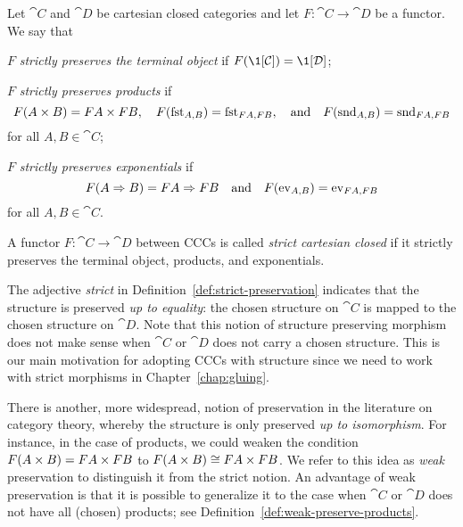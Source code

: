 \begin{defn} \label{def:strict-preservation}
Let $\cat{C}$ and $\cat{D}$ be cartesian closed categories and let $F : \cat{C} \to \cat{D}$ be a functor. We say that
\begin{enum}
    \item $F$ \emph{strictly preserves the terminal object} if $F(\1[\cat{C}]) = \1[\cat{D}]$;
    \item $F$ \emph{strictly preserves products} if
    \[ F(\cprod{A}{B}) = \cprod{FA}{FB}, \quad
        F(\mfst[A,B]) = \mfst[FA,FB], \quad\text{and}\quad
        F(\msnd[A,B]) = \msnd[FA,FB] \]
    for all $A, B \in \cat{C}$;
    \item $F$ \emph{strictly preserves exponentials} if
    \[ F(\cexp{A}{B}) = \cexp{FA}{FB} \quad\text{and}\quad
        F(\mev[A,B]) = \mev[FA,FB] \]
    for all $A, B \in \cat{C}$.
\end{enum}
\end{defn}

\begin{defn} \label{def:strict-cc-functor}
A functor $F : \cat{C} \to \cat{D}$ between CCCs is called \emph{strict cartesian closed} if it strictly preserves the terminal object, products, and exponentials.    
\end{defn}

\begin{rem} \label{rem:ccc-strict-vs-weak-preservation}
The adjective \textit{strict} in Definition~\ref{def:strict-preservation} indicates that the structure is preserved \textit{up to equality}: the chosen structure on $\cat{C}$ is mapped to the chosen structure on $\cat{D}$. Note that this notion of structure preserving morphism does not make sense when $\cat{C}$ or $\cat{D}$ does not carry a chosen structure. This is our main motivation for adopting CCCs with structure since we need to work with strict morphisms in Chapter~\ref{chap:gluing}.

There is another, more widespread, notion of preservation in the literature on category theory, whereby the structure is only preserved \textit{up to isomorphism}. For instance, in the case of products, we could weaken the condition $F(\cprod{A}{B}) = \cprod{FA}{FB}$ to $F(\cprod{A}{B}) \cong \cprod{FA}{FB}$.  We refer to this idea as \textit{weak} preservation to distinguish it from the strict notion. An advantage of weak preservation is that it is possible to generalize it to the case when $\cat{C}$ or $\cat{D}$ does not have all (chosen) products; see Definition~\ref{def:weak-preserve-products}.
\end{rem}


